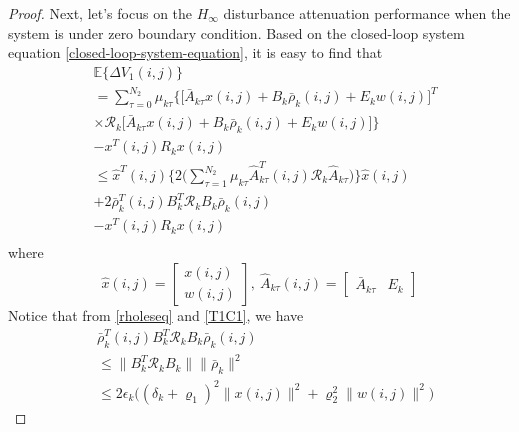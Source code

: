 \documentclass[journal,final,twocolumn]{IEEEtran}
\begin{document}
\begin{proof}
	Next, let's focus on the $H_{\infty}$  disturbance attenuation performance when the system is under zero boundary condition. Based on the closed-loop system equation \eqref{closed-loop-system-equation}, it is easy to find that
	\begin{equation}\label{DETAV1}
	\begin{split}
	&\mathbb{E}\{\varDelta V_{1}(i,j) \}\\
	&=  \sum_{\tau =0}^{N_{2}}\mu_{k\tau }\Big\{\big[\bar{A}_{k\tau }x(i,j)+B_{k}\bar{\rho}_{k}(i,j)+E_{k}w(i,j)\big]^{T}\\
	&\times \mathcal{R}_{k}\big[\bar{A}_{k\tau }x(i,j)+B_{k}\bar{\rho}_{k}(i,j)+E_{k}w(i,j)\big]\Big\}\\
	&- x^{T}(i,j)R_{k}x(i,j) \\
	&\leq \hat{x}^{T}(i,j) \Big\{2\big(\sum_{\tau =1}^{N_{2}}\mu_{k\tau }\hat{A}^{T}_{k\tau }(i,j)\mathcal{R}_{k}\hat{A}_{k\tau }\big)\Big\}\hat{x}(i,j)\\ &+2\bar{\rho}^{T}_{k}(i,j)B^{T}_{k}\mathcal{R}_{k}B_{k}\bar{\rho}_{k}(i,j) \\
	&-  x^{T}(i,j)R_{k}x(i,j)\\
	\end{split}
	\end{equation}
	where
	\begin{equation*}
		\hat{x}(i,j)=\begin{bmatrix}
		x(i,j)\\ w(i,j)
		\end{bmatrix},\ \hat{A}_{k\tau }(i,j)=\begin{bmatrix}
		\bar{A}_{k\tau }&E_{k}
		\end{bmatrix}
	\end{equation*}
	Notice that from \eqref{rholeseq} and \eqref{T1C1}, we have
	\begin{equation}\label{invRho}
		\begin{split}
		 	&\bar{\rho}^{T}_{k}(i,j)B^{T}_{k}\mathcal{R}_{k}B_{k}\bar{\rho}_{k}(i,j)\\
		 	&\leq \|B^{T}_{k}\mathcal{R}_{k}B_{k}\|\|\bar{\rho}_{k}\|^{2} \\
		 	&\leq 2\epsilon_{k}\big((\delta_{k}+\varrho_{1})^{2}\|x(i,j)\|^{2}+\varrho_{2}^{2}\|w(i,j)\|^{2} \big)

\end{split}
\end{equation}
\end{proof}
\end{document}
